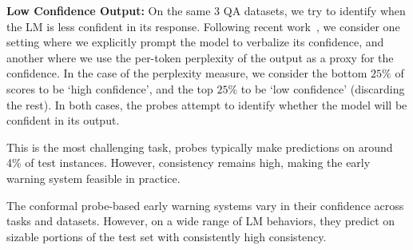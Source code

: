 \noindent\textbf{Low Confidence Output:} On the same 3 QA datasets, we try to identify when the LM is less confident in its response. Following recent work~\citep{kadavath2022language, jiang-etal-2021-know}, we consider one setting where we explicitly prompt the model to verbalize its confidence, and another where we use the per-token perplexity of the output as a proxy for the confidence. In the case of the perplexity measure, we consider the bottom $25\%$ of scores to be `high confidence', and the top $25\%$ to be `low confidence' (discarding the rest). In both cases, the probes attempt to identify whether the model will be confident in its output. 

This is the most challenging task, probes typically make predictions on around 4\% of test instances. However, consistency remains high, making the early warning system feasible in practice.   

The conformal probe-based early warning systems vary in their confidence across tasks and datasets. However, on a wide range of LM behaviors, they predict on sizable portions of the test set with consistently high consistency. 
